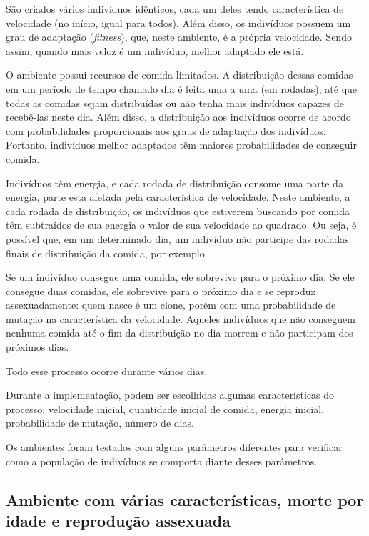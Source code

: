 \documentclass[10pt,brazil,english]{article}
\begin{document}
        São criados vários indivíduos idênticos, cada um deles tendo característica de velocidade (no início, igual para todos). Além disso, os indivíduos possuem um grau de adaptação (\textit{fitness}), que, neste ambiente, é a própria velocidade. Sendo assim, quando mais veloz é um indivíduo, melhor adaptado ele está.
        
        O ambiente possui recursos de comida limitados. A distribuição dessas comidas em um período de tempo chamado dia é feita uma a uma (em rodadas), até que todas as comidas sejam distribuídas ou não tenha mais indivíduos capazes de recebê-las neste dia. Além disso, a distribuição aos indivíduos ocorre de acordo com probabilidades proporcionais aos graus de adaptação dos indivíduos. Portanto, indivíduos melhor adaptados têm maiores probabilidades de conseguir comida.
        
        Indivíduos têm energia, e cada rodada de distribuição consome uma parte da energia, parte esta afetada pela característica de velocidade. Neste ambiente, a cada rodada de distribuição, os indivíduos que estiverem buscando por comida têm subtraídos de sua energia o valor de sua velocidade ao quadrado. Ou seja, é possível que, em um determinado dia, um indivíduo não participe das rodadas finais de distribuição da comida, por exemplo.
        
        Se um indivíduo consegue uma comida, ele sobrevive para o próximo dia. Se ele consegue duas comidas, ele sobrevive para o próximo dia e se reproduz assexuadamente: quem nasce é um clone, porém com uma probabilidade de mutação na característica da velocidade. Aqueles indivíduos que não conseguem nenhuma comida até o fim da distribuição no dia morrem e não participam dos próximos dias.
        
        Todo esse processo ocorre durante vários dias.
        
        Durante a implementação, podem ser escolhidas algumas características do processo: velocidade inicial, quantidade inicial de comida, energia inicial, probabilidade de mutação, número de dias.
        
        Os ambientes foram testados com alguns parâmetros diferentes para verificar como a população de indivíduos se comporta diante desses parâmetros.
        
        \subsection{Ambiente com várias características, morte por idade e reprodução assexuada}
        
\end{document}
